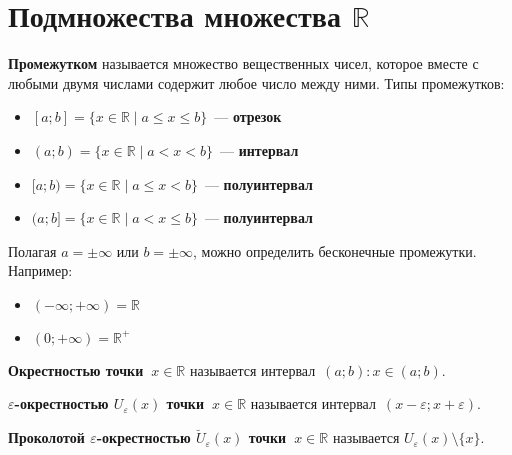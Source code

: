 \section{Подмножества множества \texorpdfstring{$\mathbb R$}{}}
 \textbf{Промежутком} называется множество вещественных чисел, которое вместе с любыми двумя числами содержит любое число между ними.
Типы промежутков:
\begin{itemize}
	\item {} $[a; b] = \{ x \in \mathbb R \mid a \leqslant x \leqslant b \}$~--- \textbf{отрезок}
	\item {} $(a; b) = \{ x \in \mathbb R \mid a < x < b \}$~--- \textbf{интервал}
	\item $[a; b) = \{ x \in \mathbb R \mid a \leqslant x < b \}$~--- \textbf{полуинтервал}
	\item $(a; b] = \{ x \in \mathbb R \mid a < x \leqslant b \}$~--- \textbf{полуинтервал}
\end{itemize}

Полагая $a = \pm\infty$ или $b = \pm\infty$, можно определить бесконечные промежутки. Например:
\begin{itemize}
	\item $(-\infty; +\infty) = \mathbb R$
	\item $(0; +\infty) = \mathbb R^+$
\end{itemize}

 \textbf{Окрестностью точки~$x \in \mathbb R$} называется интервал~$(a; b) \colon x \in (a; b)$.

\textbf{$\varepsilon$-окрестностью $U_\varepsilon(x)$ точки~$x \in \mathbb R$} называется интервал~$(x - \varepsilon; x + \varepsilon)$.

\textbf{Проколотой $\varepsilon$-окрестностью $\breve U_\varepsilon(x)$ точки~$x \in \mathbb R$} называется $U_\varepsilon(x) \setminus \{ x \}$.